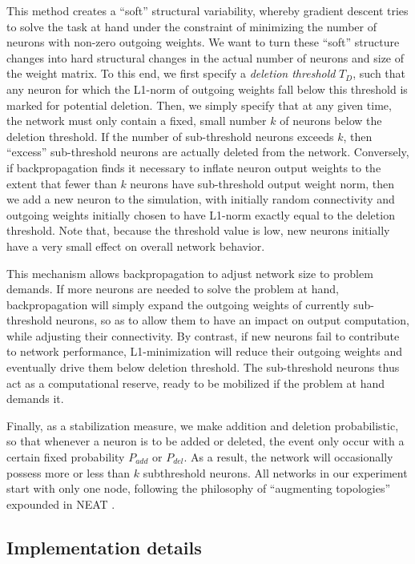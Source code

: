 \documentclass{article}
\begin{document}
This method creates a ``soft''
structural variability, whereby gradient descent tries to solve the task at
hand under the constraint of minimizing the number of neurons with non-zero
outgoing weights. We want to turn these ``soft'' structure changes into hard
structural changes in the actual number of neurons and size of the weight
matrix. To this end, we first specify a \textit{deletion threshold} $T_D$, such
that any neuron for which the L1-norm of outgoing weights fall below this threshold is marked for
potential deletion. Then, we simply specify that at any given time, the network
must only contain a fixed, small number $k$ of neurons below the deletion
threshold. If the number of sub-threshold neurons exceeds $k$, then ``excess''
sub-threshold neurons are actually deleted from the network.  Conversely, if
backpropagation finds it necessary to inflate neuron output weights to the extent that
fewer than $k$ neurons have sub-threshold output weight norm, then we add a new neuron
to the simulation, with initially random connectivity and outgoing weights
initially chosen to have L1-norm exactly equal to the deletion threshold. Note that, because the threshold
value is low, new neurons initially have a very small effect on overall network
behavior.

This mechanism allows backpropagation to adjust network size to problem
demands. If more neurons are needed to solve the problem at hand,
backpropagation will simply expand the outgoing weights of currently sub-threshold
neurons, so as to allow them to have an impact on output computation, while adjusting their connectivity. By
contrast, if new neurons fail to contribute to network performance,
L1-minimization  will reduce their outgoing weights and eventually drive them below
deletion threshold. The sub-threshold neurons thus act as a computational
reserve, ready to be mobilized if the problem at hand demands it.

Finally, as a stabilization measure, we make
addition and deletion probabilistic, so that whenever a neuron is to be added
or deleted, the event only occur with a certain fixed probability $P_{add}$ or
$P_{del}$. As a result, the network will occasionally possess more or less than
$k$ subthreshold neurons. All networks in our experiment start with only one
node, following the philosophy of ``augmenting topologies'' expounded in NEAT
\cite{Stanley2002-ug}.

\subsection{Implementation details}
\end{document}
